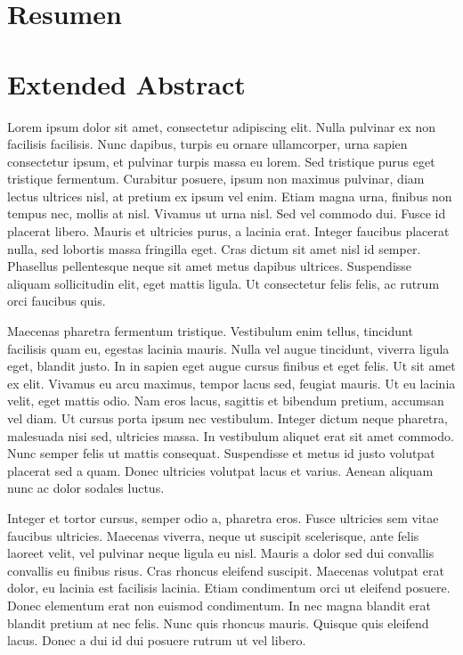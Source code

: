 \section*{Resumen}

\lipsum

\newpage

\section*{Extended Abstract}



Lorem ipsum dolor sit amet, consectetur adipiscing elit. Nulla pulvinar ex non facilisis facilisis. Nunc dapibus, turpis eu ornare ullamcorper, urna sapien consectetur ipsum, et pulvinar turpis massa eu lorem. Sed tristique purus eget tristique fermentum. Curabitur posuere, ipsum non maximus pulvinar, diam lectus ultrices nisl, at pretium ex ipsum vel enim. Etiam magna urna, finibus non tempus nec, mollis at nisl. Vivamus ut urna nisl. Sed vel commodo dui. Fusce id placerat libero. Mauris et ultricies purus, a lacinia erat. Integer faucibus placerat nulla, sed lobortis massa fringilla eget. Cras dictum sit amet nisl id semper. Phasellus pellentesque neque sit amet metus dapibus ultrices. Suspendisse aliquam sollicitudin elit, eget mattis ligula. Ut consectetur felis felis, ac rutrum orci faucibus quis.

Maecenas pharetra fermentum tristique. Vestibulum enim tellus, tincidunt facilisis quam eu, egestas lacinia mauris. Nulla vel augue tincidunt, viverra ligula eget, blandit justo. In in sapien eget augue cursus finibus et eget felis. Ut sit amet ex elit. Vivamus eu arcu maximus, tempor lacus sed, feugiat mauris. Ut eu lacinia velit, eget mattis odio. Nam eros lacus, sagittis et bibendum pretium, accumsan vel diam. Ut cursus porta ipsum nec vestibulum. Integer dictum neque pharetra, malesuada nisi sed, ultricies massa. In vestibulum aliquet erat sit amet commodo. Nunc semper felis ut mattis consequat. Suspendisse et metus id justo volutpat placerat sed a quam. Donec ultricies volutpat lacus et varius. Aenean aliquam nunc ac dolor sodales luctus.

Integer et tortor cursus, semper odio a, pharetra eros. Fusce ultricies sem vitae faucibus ultricies. Maecenas viverra, neque ut suscipit scelerisque, ante felis laoreet velit, vel pulvinar neque ligula eu nisl. Mauris a dolor sed dui convallis convallis eu finibus risus. Cras rhoncus eleifend suscipit. Maecenas volutpat erat dolor, eu lacinia est facilisis lacinia. Etiam condimentum orci ut eleifend posuere. Donec elementum erat non euismod condimentum. In nec magna blandit erat blandit pretium at nec felis. Nunc quis rhoncus mauris. Quisque quis eleifend lacus. Donec a dui id dui posuere rutrum ut vel libero.

